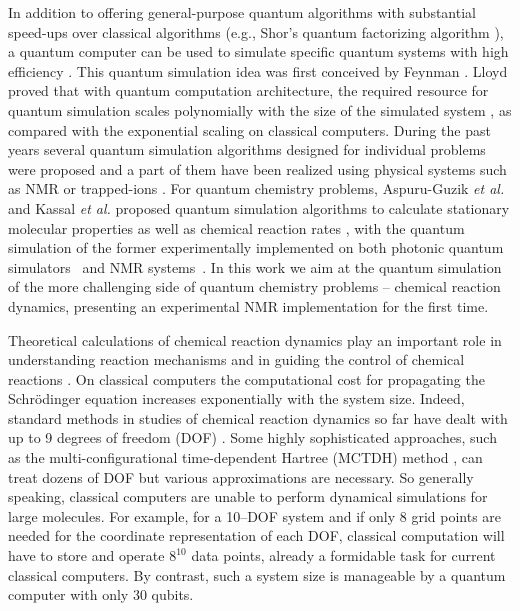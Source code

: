 \documentclass[prl,twocolumn,showpacs]{revtex4}
\begin{document}
In addition to offering general-purpose quantum algorithms with substantial speed-ups over classical algorithms \cite{Nielsen}
(e.g., Shor's quantum factorizing algorithm \cite{Shor}), a quantum computer can be used to simulate
specific quantum systems with high efficiency \cite{Buluta}.
This quantum simulation idea was first conceived by Feynman \cite{Feynman}.
Lloyd proved that with quantum computation architecture,
the required resource for quantum simulation scales polynomially
with the size of the simulated system \cite{Lloyd}, as compared with the exponential scaling on  classical computers.
During the past years several quantum simulation algorithms designed for individual problems were
proposed \cite{Zalka,Abrams,Wu,Smirnov,Lidar} and a part of them have been realized
using physical systems such as NMR \cite{Peng,Somaroo,Negrevergne} or trapped-ions \cite{Friedenauer}.
For quantum chemistry problems, Aspuru-Guzik {\it et al.} and Kassal {\it et al.} proposed quantum simulation algorithms
to calculate stationary molecular properties \cite{static} as well as chemical reaction rates \cite{dynamical}, with the quantum simulation
of the former experimentally implemented on both photonic quantum simulators~\cite{static_exp1} and
NMR systems~\cite{static_exp2}.
In this work we aim at the quantum simulation of the more challenging side of quantum chemistry problems -- chemical reaction dynamics,
presenting an experimental NMR implementation for the first time.

Theoretical calculations of chemical reaction dynamics
play an important role in understanding reaction mechanisms and in guiding
the control of chemical reactions \cite{rabitz,rice-brumer}. On classical computers
the computational cost for propagating the Schr\"{o}dinger equation
increases exponentially with the system size.
Indeed, standard methods in studies of chemical reaction dynamics
so far have dealt with up to 9 degrees of freedom (DOF) \cite{ninedegree}.
Some highly sophisticated approaches,
such as the multi-configurational time-dependent Hartree (MCTDH) method \cite{mctdh},
can treat dozens of DOF but various approximations are necessary.
So generally speaking, classical computers are unable to perform dynamical simulations for large molecules.
For example, for a 10--DOF system
and if only 8 grid points are needed for the coordinate representation of each DOF,
classical computation will have to store and operate $8^{10}$ data points,
already a formidable task for current classical computers.
By contrast, such a system size is manageable by a quantum computer with
only 30 qubits.
\end{document}

